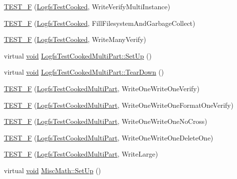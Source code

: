 \begin{DoxyCompactItemize}
\hyperlink{group___unit_tests_ga669c582bc27e4f9ac82e377803246061}{T\-E\-S\-T\-\_\-\-F} (\hyperlink{class_logfs_test_cooked}{Logfs\-Test\-Cooked}, Write\-Verify\-Multi\-Instance)
\item 
\hyperlink{group___unit_tests_ga3a5ba5e7649f2e14d3092f671c996e3e}{T\-E\-S\-T\-\_\-\-F} (\hyperlink{class_logfs_test_cooked}{Logfs\-Test\-Cooked}, Fill\-Filesystem\-And\-Garbage\-Collect)
\item 
\hyperlink{group___unit_tests_ga64b4ab283359ebc3533f35a7fb7e6fe3}{T\-E\-S\-T\-\_\-\-F} (\hyperlink{class_logfs_test_cooked}{Logfs\-Test\-Cooked}, Write\-Many\-Verify)
\item 
virtual \hyperlink{group___n_a_m_e_ga18028b8badbf1ea7e704ccac3c488e82}{void} \hyperlink{group___unit_tests_ga6143b6807b4ed29675a12d317dda0b87}{Logfs\-Test\-Cooked\-Multi\-Part\-::\-Set\-Up} ()
\item 
virtual \hyperlink{group___n_a_m_e_ga18028b8badbf1ea7e704ccac3c488e82}{void} \hyperlink{group___unit_tests_ga5031a2adb8db0e1125f0f2f2e5d0c82b}{Logfs\-Test\-Cooked\-Multi\-Part\-::\-Tear\-Down} ()
\item 
\hyperlink{group___unit_tests_ga24a114e324d7b9f86337c08c9f2b6c64}{T\-E\-S\-T\-\_\-\-F} (\hyperlink{class_logfs_test_cooked_multi_part}{Logfs\-Test\-Cooked\-Multi\-Part}, Write\-One\-Write\-One\-Verify)
\item 
\hyperlink{group___unit_tests_ga66d2a26c55d24d0da23b04752a7a6fb0}{T\-E\-S\-T\-\_\-\-F} (\hyperlink{class_logfs_test_cooked_multi_part}{Logfs\-Test\-Cooked\-Multi\-Part}, Write\-One\-Write\-One\-Format\-One\-Verify)
\item 
\hyperlink{group___unit_tests_ga764d406c79c1ec4236e5f03c1fc48e46}{T\-E\-S\-T\-\_\-\-F} (\hyperlink{class_logfs_test_cooked_multi_part}{Logfs\-Test\-Cooked\-Multi\-Part}, Write\-One\-Write\-One\-No\-Cross)
\item 
\hyperlink{group___unit_tests_ga4b1eaeb81dc020435304ff23a66895c8}{T\-E\-S\-T\-\_\-\-F} (\hyperlink{class_logfs_test_cooked_multi_part}{Logfs\-Test\-Cooked\-Multi\-Part}, Write\-One\-Write\-One\-Delete\-One)
\item 
\hyperlink{group___unit_tests_ga4ae6529c9fa155129efba3de7100b3d9}{T\-E\-S\-T\-\_\-\-F} (\hyperlink{class_logfs_test_cooked_multi_part}{Logfs\-Test\-Cooked\-Multi\-Part}, Write\-Large)
\item 
virtual \hyperlink{group___n_a_m_e_ga18028b8badbf1ea7e704ccac3c488e82}{void} \hyperlink{group___unit_tests_gaf32e95ea690177429881d65ee89a43e2}{Misc\-Math\-::\-Set\-Up} ()
\item 

\end{DoxyCompactItemize}
